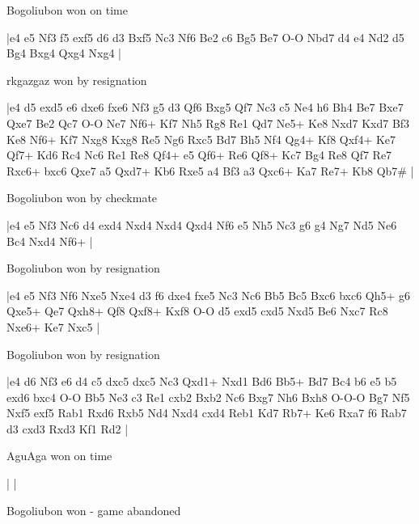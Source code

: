 \showboard

Bogoliubon won on time

\makegametitle
|e4 e5 Nf3 f5 exf5 d6 d3 Bxf5 Nc3 Nf6 Be2 c6 Bg5 Be7 O-O Nbd7 d4 e4 Nd2 d5 Bg4 Bxg4 Qxg4 Nxg4  |

\showboard

rkgazgaz won by resignation

\makegametitle
|e4 d5 exd5 e6 dxe6 fxe6 Nf3 g5 d3 Qf6 Bxg5 Qf7 Nc3 c5 Ne4 h6 Bh4 Be7 Bxe7 Qxe7 Be2 Qc7 O-O Ne7 Nf6+ Kf7 Nh5 Rg8 Re1 Qd7 Ne5+ Ke8 Nxd7 Kxd7 Bf3 Ke8 Nf6+ Kf7 Nxg8 Kxg8 Re5 Ng6 Rxc5 Bd7 Bh5 Nf4 Qg4+ Kf8 Qxf4+ Ke7 Qf7+ Kd6 Rc4 Nc6 Re1 Re8 Qf4+ e5 Qf6+ Re6 Qf8+ Kc7 Bg4 Re8 Qf7 Re7 Rxc6+ bxc6 Qxe7 a5 Qxd7+ Kb6 Rxe5 a4 Bf3 a3 Qxc6+ Ka7 Re7+ Kb8 Qb7\#  |

\showboard

Bogoliubon won by checkmate

\makegametitle
|e4 e5 Nf3 Nc6 d4 exd4 Nxd4 Nxd4 Qxd4 Nf6 e5 Nh5 Nc3 g6 g4 Ng7 Nd5 Ne6 Bc4 Nxd4 Nf6+  |

\showboard

Bogoliubon won by resignation

\makegametitle
|e4 e5 Nf3 Nf6 Nxe5 Nxe4 d3 f6 dxe4 fxe5 Nc3 Nc6 Bb5 Bc5 Bxc6 bxc6 Qh5+ g6 Qxe5+ Qe7 Qxh8+ Qf8 Qxf8+ Kxf8 O-O d5 exd5 cxd5 Nxd5 Be6 Nxc7 Rc8 Nxe6+ Ke7 Nxc5  |

\showboard

Bogoliubon won by resignation

\makegametitle
|e4 d6 Nf3 e6 d4 c5 dxc5 dxc5 Nc3 Qxd1+ Nxd1 Bd6 Bb5+ Bd7 Bc4 b6 e5 b5 exd6 bxc4 O-O Bb5 Ne3 c3 Re1 cxb2 Bxb2 Nc6 Bxg7 Nh6 Bxh8 O-O-O Bg7 Nf5 Nxf5 exf5 Rab1 Rxd6 Rxb5 Nd4 Nxd4 cxd4 Reb1 Kd7 Rb7+ Ke6 Rxa7 f6 Rab7 d3 cxd3 Rxd3 Kf1 Rd2  |

\showboard

AguAga won on time

\makegametitle
| |

\showboard

Bogoliubon won - game abandoned

